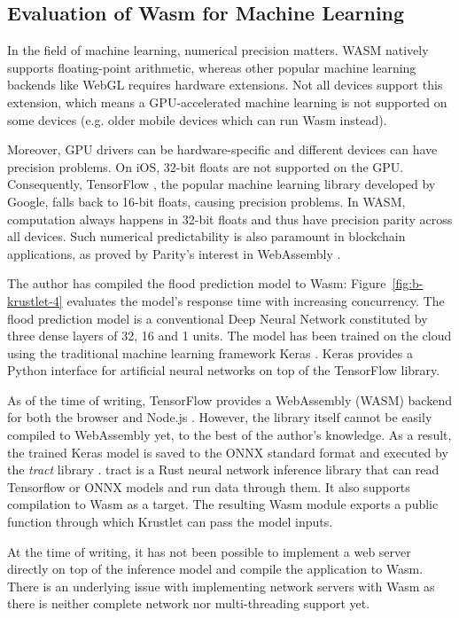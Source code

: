 \subsection{Evaluation of Wasm for Machine Learning}

In the field of machine learning, numerical precision matters. WASM natively supports floating-point arithmetic, whereas other popular machine learning backends like WebGL requires hardware extensions. Not all devices support this extension, which means a GPU-accelerated machine learning is not supported on some devices (e.g. older mobile devices which can run Wasm instead).

Moreover, GPU drivers can be hardware-specific and different devices can have precision problems. On iOS, 32-bit floats are not supported on the GPU. Consequently, TensorFlow \cite{tensorflow}, the popular machine learning library developed by Google, falls back to 16-bit floats, causing precision problems. In WASM, computation always happens in 32-bit floats and thus have precision parity across all devices. Such numerical predictability is also paramount in blockchain applications, as proved by Parity's interest in WebAssembly \cite{parity-wasm}.

The author has compiled the flood prediction model to Wasm: Figure~\ref{fig:b-krustlet-4} evaluates the model's response time with increasing concurrency. The flood prediction model is a conventional Deep Neural Network constituted by three dense layers of 32, 16 and 1 units. The model has been trained on the cloud using the traditional machine learning framework Keras \cite{keras}. Keras provides a Python interface for artificial neural networks on top of the TensorFlow library.

As of the time of writing, TensorFlow provides a WebAssembly (WASM) backend for both the browser and Node.js \cite{tf-wasm}. However, the library itself cannot be easily compiled to WebAssembly yet, to the best of the author's knowledge. As a result, the trained Keras model is saved to the ONNX \cite{onnx} standard format and executed by the \emph{tract} library \cite{tract}. tract is a Rust neural network inference library that can read Tensorflow or ONNX models and run data through them. It also supports compilation to Wasm as a target. The resulting Wasm module exports a public function through which Krustlet can pass the model inputs. 

At the time of writing, it has not been possible to implement a web server directly on top of the inference model and compile the application to Wasm. There is an underlying issue with implementing network servers with Wasm as there is neither complete network nor multi-threading support yet.

